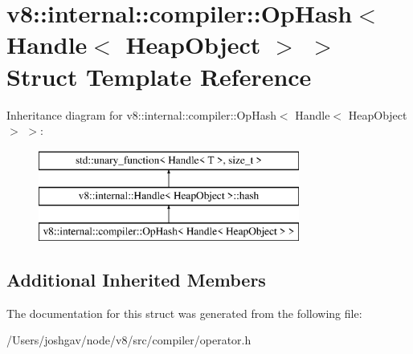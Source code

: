 \hypertarget{structv8_1_1internal_1_1compiler_1_1_op_hash_3_01_handle_3_01_heap_object_01_4_01_4}{}\section{v8\+:\+:internal\+:\+:compiler\+:\+:Op\+Hash$<$ Handle$<$ Heap\+Object $>$ $>$ Struct Template Reference}
\label{structv8_1_1internal_1_1compiler_1_1_op_hash_3_01_handle_3_01_heap_object_01_4_01_4}
Inheritance diagram for v8\+:\+:internal\+:\+:compiler\+:\+:Op\+Hash$<$ Handle$<$ Heap\+Object $>$ $>$\+:\begin{figure}[H]
\begin{center}
\leavevmode
\includegraphics[height=3.000000cm]{structv8_1_1internal_1_1compiler_1_1_op_hash_3_01_handle_3_01_heap_object_01_4_01_4}
\end{center}
\end{figure}
\subsection*{Additional Inherited Members}


The documentation for this struct was generated from the following file\+:\begin{DoxyCompactItemize}
\item 
/\+Users/joshgav/node/v8/src/compiler/operator.\+h\end{DoxyCompactItemize}
